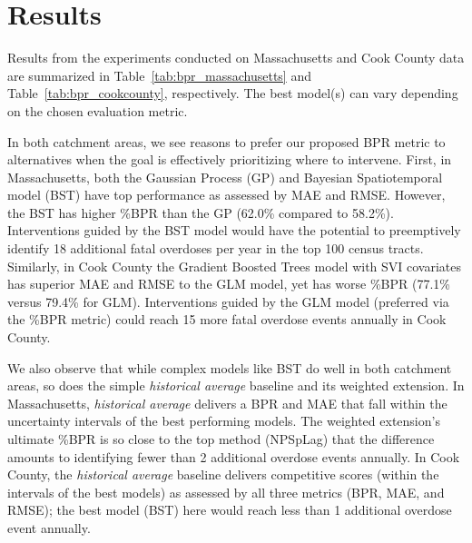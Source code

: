 \section{Results}\label{results}

Results from the experiments conducted on Massachusetts and Cook County data are summarized in Table~\ref{tab:bpr_massachusetts} and Table~\ref{tab:bpr_cookcounty}, respectively. The best model(s) can vary depending on the chosen evaluation metric.

In both catchment areas, we see reasons to prefer our proposed BPR metric to alternatives when the goal is effectively prioritizing where to intervene. First, in Massachusetts, both the Gaussian Process (GP) and Bayesian Spatiotemporal model (BST) have top performance as assessed by MAE and RMSE. However, the BST has higher \%BPR than the GP (62.0\% compared to 58.2\%). Interventions guided by the BST model would have the potential to preemptively identify 18 additional fatal overdoses per year in the top 100 census tracts. Similarly, in Cook County the Gradient Boosted Trees model with SVI covariates has superior MAE and RMSE to the GLM model, yet has worse \%BPR (77.1\% versus 79.4\% for GLM). Interventions guided by the GLM model (preferred via the \%BPR metric) could reach 15 more fatal overdose events annually in Cook County.

We also observe that while complex models like BST do well in both catchment areas, so does the simple \emph{historical average} baseline and its weighted extension. In Massachusetts, \emph{historical average} delivers a BPR and MAE that fall within the uncertainty intervals of the best performing models. The weighted extension's ultimate \%BPR is so close to the top method (NPSpLag) that the difference amounts to identifying fewer than 2 additional overdose events annually. In Cook County, the \emph{historical average} baseline delivers competitive scores (within the intervals of the best models) as assessed by all three metrics (BPR, MAE, and RMSE); the best model (BST) here would reach less than 1 additional overdose event annually.




